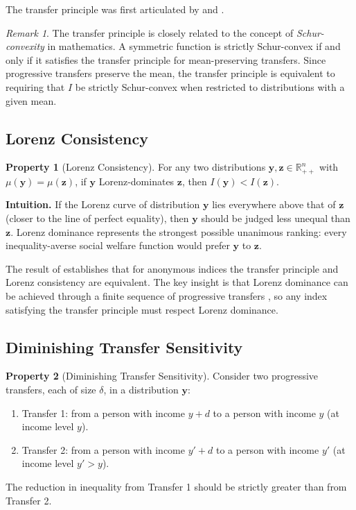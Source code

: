 \documentclass[12pt]{article}
\theoremstyle{plain}
\theoremstyle{definition}
\newtheorem{axiom}{Property}
\theoremstyle{remark}
\newtheorem{remark}[theorem]{Remark}
\newcommand{\R}{\mathbb{R}}
\newcommand{\bfy}{\mathbf{y}}
\newcommand{\bfz}{\mathbf{z}}
\begin{document}
The transfer principle was first articulated by \citet{Pigou1912} and \citet{Dalton1920}.

\begin{remark}
The transfer principle is closely related to the concept of \emph{Schur-convexity} in mathematics.
A symmetric function is strictly Schur-convex if and only if it satisfies the transfer principle for mean-preserving transfers.
Since progressive transfers preserve the mean, the transfer principle is equivalent to requiring that $I$ be strictly Schur-convex when restricted to distributions with a given mean.
\end{remark}

\subsection{Lorenz Consistency}\label{sec:lorenz}

\begin{axiom}[Lorenz Consistency]\label{ax:lorenz}
For any two distributions $\bfy, \bfz \in \R_{++}^n$ with $\mu(\bfy) = \mu(\bfz)$, if $\bfy$ Lorenz-dominates $\bfz$, then $I(\bfy) < I(\bfz)$.
\end{axiom}

\textbf{Intuition.}
If the Lorenz curve of distribution $\bfy$ lies everywhere above that of $\bfz$ (closer to the line of perfect equality), then $\bfy$ should be judged less unequal than $\bfz$.
Lorenz dominance represents the strongest possible unanimous ranking: every inequality-averse social welfare function would prefer $\bfy$ to $\bfz$.

The result of \citet{DasGupta1973} establishes that for anonymous indices the transfer principle and Lorenz consistency are equivalent.
The key insight is that Lorenz dominance can be achieved through a finite sequence of progressive transfers \citep{Hardy1934}, so any index satisfying the transfer principle must respect Lorenz dominance.

\subsection{Diminishing Transfer Sensitivity}\label{sec:dts}

\begin{axiom}[Diminishing Transfer Sensitivity]\label{ax:dts}
Consider two progressive transfers, each of size $\delta$, in a distribution $\bfy$:
\begin{enumerate}[label=(\roman*)]
    \item Transfer 1: from a person with income $y + d$ to a person with income $y$ (at income level $y$).
    \item Transfer 2: from a person with income $y' + d$ to a person with income $y'$ (at income level $y' > y$).
\end{enumerate}
The reduction in inequality from Transfer 1 should be strictly greater than from Transfer 2.
\end{axiom}
\end{document}

